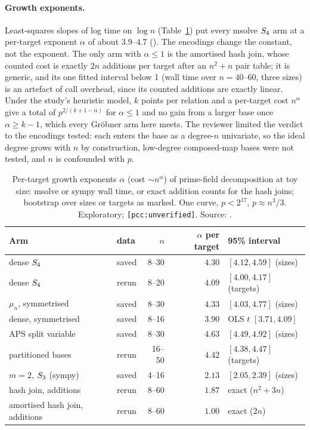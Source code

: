 \paragraph{Growth exponents.} Least-squares slopes of log time on $\log n$
(Table~\ref{tab:gb-growth}) put every msolve $S_{4}$ arm at a per-target
exponent $\alpha$ of about $3.9$--$4.7$
(). The
encodings change the constant, not the exponent. The only arm with
$\alpha\le1$ is the amortised hash join, whose counted cost is exactly
$2n$ additions per target after an $n^2+n$ pair table; it is generic, and
its one fitted interval below 1 (wall time over $n=40$--60, three sizes) is
an artefact of call overhead, since its counted additions are exactly
linear. Under the study's heuristic model, $k$ points per relation and a
per-target cost $n^\alpha$ give a total of $p^{2/(k+1-\alpha)}$ for
$\alpha\le1$ and no gain from a larger base once $\alpha\ge k-1$, which
every Gröbner arm here meets. The reviewer limited the verdict to the
encodings tested: each enters the base as a degree-$n$ univariate, so the
ideal degree grows with $n$ by construction, low-degree composed-map bases
were not tested, and $n$ is confounded with $p$.

\begin{table}[t]
\centering\small
\begin{tabular}{@{}llrrl@{}}
\toprule
Arm & data & $n$ & $\alpha$ per target & 95\% interval \\
\midrule
dense $S_{4}$ & saved & 8--30 & $4.30$ & $[4.12,4.59]$ (sizes) \\
dense $S_{4}$ & rerun & 8--20 & $4.09$ & $[4.00,4.17]$ (targets) \\
$\mu_n$, symmetrised & saved & 8--30 & $4.33$ & $[4.03,4.77]$ (sizes) \\
dense, symmetrised & saved & 8--16 & $3.90$ & OLS $t$ $[3.71,4.09]$ \\
APS split variable & saved & 8--30 & $4.63$ & $[4.49,4.92]$ (sizes) \\
partitioned bases & rerun & 16--50 & $4.42$ & $[4.38,4.47]$ (targets) \\
$m=2$, $S_{3}$ (sympy) & saved & 4--16 & $2.13$ & $[2.05,2.39]$ (sizes) \\
hash join, additions & rerun & 8--60 & $1.87$ & exact ($n^2+3n$) \\
amortised hash join, additions & rerun & 8--60 & $1.00$ & exact ($2n$) \\
\bottomrule
\end{tabular}
\caption[]{Per-target growth exponents $\alpha$ (cost $\sim n^\alpha$) of
prime-field decomposition at toy size: msolve or sympy wall time, or exact
addition counts for the hash joins; bootstrap over sizes or targets as
marked. One curve, $p<2^{17}$, $p\approx n^3/3$. Exploratory;
\texttt{[pcc:unverified]}. Source:
.}
\label{tab:gb-growth}
\end{table}

